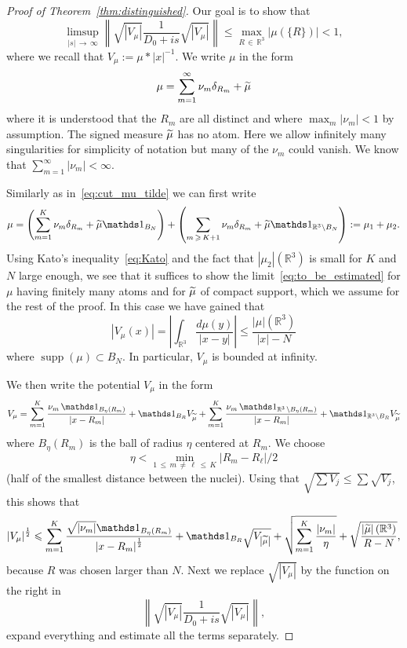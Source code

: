 \documentclass[AHL,Unicode,published]{cedram}
\newcommand{\R}{\mathbb{R}}
\DeclareMathOperator{\supp}{supp}
\newcommand\1{{\ensuremath {\mathds 1} }}
\newcommand{\ii}{\infty}
\newcommand{\norm}[1]{ \left\| #1 \right\|}
\renewcommand{\geq}{\geqslant}
\renewcommand{\leq}{\leqslant}
\renewcommand{\tilde}{\widetilde}
\let\oldtilde\tilde
\renewcommand*{\tilde}[1]{\mathchoice{\widetilde{#1}}{\widetilde{#1}}{\oldtilde{#1}}{\oldtilde{#1}}}
\begin{document}
\begin{proof}[Proof of Theorem~\ref{thm:distinguished}]
Our goal is to show that
\begin{equation}\label{eq:to_be_estimated}
\limsup_{|s|\,\to\,\ii} \norm{\sqrt{\left|V_\mu\right|}\frac{1}{D_0+is}\sqrt{\left|V_\mu\right|}}\leq \max_{R\,\in\,\R^3}\left|\mu(\{R\})\right|<1,
\end{equation}
where we recall that $V_\mu:=\mu\ast|x|^{-1}$. We write $\mu$ in the form
\[
\mu=\sum_{m=1}^\ii\nu_m\delta_{R_m}+\tilde\mu
\]
where it is understood that the $R_m$ are all distinct and where $\max_m|\nu_m|<1$ by assumption. The signed measure $\tilde\mu$ has no atom. Here we allow infinitely many singularities for simplicity of notation but many of the $\nu_m$ could vanish. We know that $\sum_{m=1}^\ii|\nu_m|<\ii$.

\vspace{3pt}
Similarly as in~\eqref{eq:cut_mu_tilde} we can first write
\begin{equation}\label{eq:decompose_mu}
\mu=\left(\sum_{m=1}^K\nu_m\delta_{R_m}+\tilde\mu\1_{B_N}\right)+\left(\sum_{m\,\geq\,K+1}\nu_m\delta_{R_m}+\tilde\mu\1_{\R^3\setminus B_N}\right):=\mu_1+\mu_2.
\end{equation}
Using Kato's inequality~\eqref{eq:Kato} and the fact that $|\mu_2|(\R^3)$ is small for $K$ and $N$ large enough, we see that it suffices to show the limit~\eqref{eq:to_be_estimated} for $\mu$ having finitely many atoms and for $\tilde\mu$ of compact support, which we assume for the rest of the proof. In this case we have gained that
\[
\left|V_{\mu}(x)\right|=\left|\int_{\R^3}\frac{d\mu(y)}{\left|x-y\right|}\right|\leq \frac{|\mu|\left(\R^3\right)}{|x|-N}
\]
where ${\supp}(\mu)\subset B_N$. In particular, $V_\mu$ is bounded at infinity.

We then write the potential $V_\mu$ in the form
\[
V_\mu=\sum_{m=1}^K\frac{\nu_m\,\1_{B_\eta(R_m)}}{|x-R_m|}+\1_{B_R}V_{\tilde\mu}+\sum_{m=1}^K\frac{\nu_m\,\1_{\R^3\,\setminus B_\eta(R_m)}}{|x-R_m|}+\1_{\R^3\setminus B_R}V_{\tilde\mu}
\]
where $B_\eta(R_m)$ is the ball of radius $\eta$ centered at $R_m$. We choose
\[
\eta<\min_{1\,\leq\,m\,\neq\,\ell\,\leq\,K}\left|R_m-R_\ell\right|/2
\]
(half of the smallest distance between the nuclei). Using that $\sqrt{\sum V_j}\leq \sum\sqrt{V_j}$, this shows that
\begin{equation}\label{eq:decomp_sqrt_V_mu}
\left|V_\mu\right|^{\frac12}\leq \sum_{m=1}^K\frac{\sqrt{|\nu_m|}\1_{B_\eta(R_m)}}{\left|x-R_m\right|^{\frac12}}+\1_{B_R}\sqrt{V_{\left|\tilde\mu\right|}}+\sqrt{\sum_{m=1}^K\frac{\left|\nu_m\right|}{\eta}}+\sqrt{\frac{\left|\tilde\mu\right|\left(\R^3\right)}{R-N}},
\end{equation}
because $R$ was chosen larger than $N$. Next we replace $\sqrt{|V_\mu|}$ by the function on the right in
\[
\norm{\sqrt{\left|V_\mu\right|}\frac{1}{D_0+is}\sqrt{\left|V_\mu\right|}},
\]
expand everything and estimate all the terms separately.


\end{proof}
\end{document}
